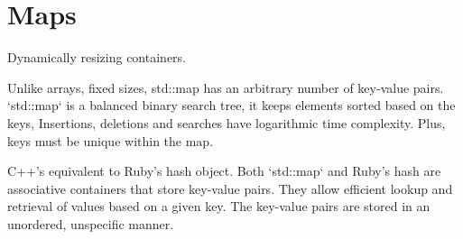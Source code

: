 \documentclass[openany]{report}
\begin{document}
\section{Maps}

Dynamically resizing containers.

Unlike arrays, fixed sizes, std::map has an arbitrary number of key-value pairs.
`std::map` is a balanced binary search tree, it keeps elements sorted based on the keys, 
Insertions, deletions and searches have logarithmic time complexity.
Plus, keys must be unique within the map.

C++'s equivalent to Ruby's hash object. 
Both `std::map` and Ruby's hash are associative containers that store key-value pairs.
They allow efficient lookup and retrieval of values based on a given key.
The key-value pairs are stored in an unordered, unspecific manner.
\end{document}
